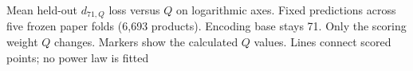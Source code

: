 \caption{Mean held-out $d_{71,Q}$ loss versus $Q$ on logarithmic axes. Fixed predictions across five frozen paper folds (6{,}693 products). Encoding base stays 71. Only the scoring weight $Q$ changes. Markers show the calculated $Q$ values. Lines connect scored points; no power law is fitted}
